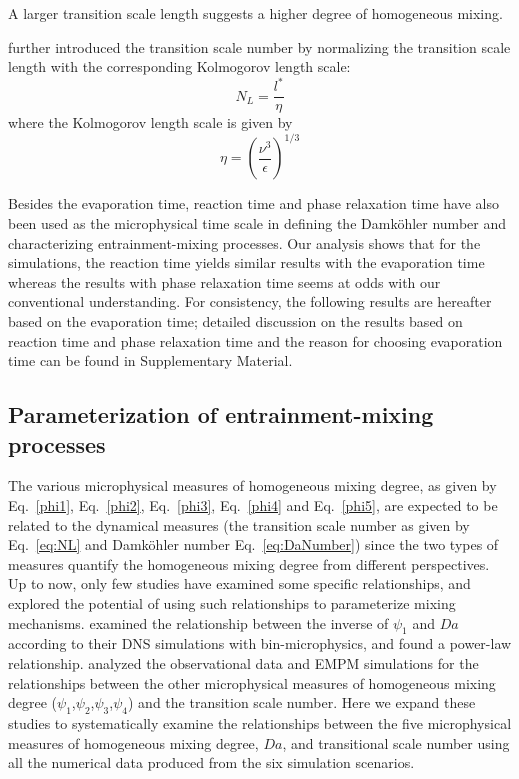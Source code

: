 \documentclass[draft,linenumbers]{agujournal}
\newcommand{\Eq}[1]{Eq.~\eqref{#1}}
\begin{document}
A larger transition scale length suggests a higher degree of homogeneous mixing.
 
\citet{Lu2011} further introduced the transition scale number by normalizing the transition scale length with the corresponding Kolmogorov length scale:
\begin{equation}
N_{L}=\frac{l^{*}}{\eta}\label{eq:NL}
\end{equation}
where the Kolmogorov length scale is given by
\begin{equation}
\eta = (\frac{\nu^3}{\epsilon})^{1/3}
\end{equation}

{\color{green} Besides the evaporation time, reaction time \citep{Lehmann2009} and phase relaxation time\citep{Kumar12} have also been used as the microphysical time scale in defining the Damk\"{o}hler number and characterizing entrainment-mixing processes.
Our analysis shows that for the simulations, the reaction time yields similar results with the evaporation time whereas the results with phase relaxation time seems at odds with our conventional understanding. For consistency, the following results are hereafter based on the evaporation time; detailed discussion on the results based on reaction time and phase relaxation time and the reason for choosing evaporation time can be found in Supplementary Material.}
 
\subsection{Parameterization of entrainment-mixing processes}
The various microphysical measures of homogeneous mixing degree, as given by \Eq{phi1}, \Eq{phi2}, \Eq{phi3}, \Eq{phi4} and \Eq{phi5}, are expected to be related to the dynamical measures (the transition scale number as given by \Eq{eq:NL} and Damk\"ohler number \Eq{eq:DaNumber}) since the two types of measures quantify the homogeneous mixing degree from different perspectives. Up to now, only few studies have examined some specific relationships, and explored the potential of using such relationships to parameterize mixing mechanisms. \citet{And09} examined the relationship between the inverse of $\psi_1$ and $Da$ according to their DNS simulations with bin-microphysics, and found a power-law relationship. \citet{Lu2013a, Lu2014} analyzed the observational data and EMPM simulations for the relationships between the other microphysical measures of homogeneous mixing degree ($\psi_1$,$\psi_2$,$\psi_3$,$\psi_4$) and the transition scale number. Here we expand these studies to systematically examine the relationships between the five microphysical measures of homogeneous mixing degree, $Da$, and transitional scale number using all the numerical data produced from the six simulation scenarios.
\end{document}
